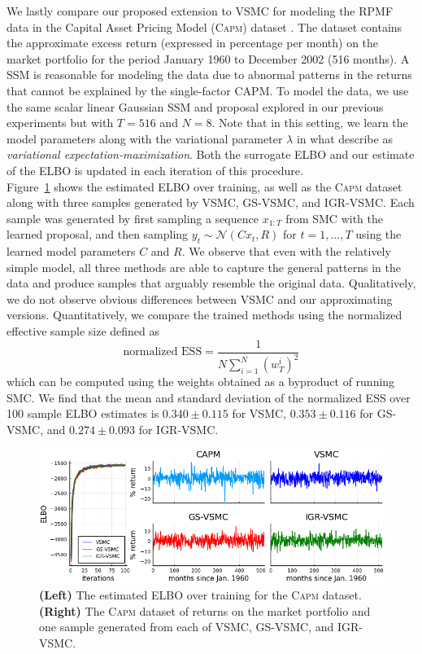 \documentclass[12pt]{article}
\newcommand{\vsmc}{\textsc{VSMC}\xspace}
\newcommand{\gsvsmc}{\textsc{GS-VSMC}\xspace}
\newcommand{\igrvsmc}{\textsc{IGR-VSMC}\xspace}
\newcommand{\smc}{\textsc{SMC}\xspace}
\newcommand{\elbo}{\textsc{ELBO}\xspace}
\newcommand{\ssm}{\textsc{SSM}\xspace}
\newcommand{\capm}{\textsc{Capm}\xspace}
\begin{document}
We lastly compare our proposed extension to \vsmc for modeling the \textsc{RPMF} data in the Capital Asset Pricing Model (\capm) dataset \parencite{Verbeek:2004}. The dataset contains the approximate excess return (expressed in percentage per month) on the market portfolio for the period January 1960 to December 2002 (516 months). A \ssm is reasonable for modeling the data due to abnormal patterns in the returns that cannot be explained by the single-factor CAPM. To model the data, we use the same scalar linear Gaussian \ssm and proposal explored in our previous experiments but with $T=516$ and $N=8$. Note that in this setting, we learn the model parameters along with the variational parameter $\lambda$ in what \textcite{Naesseth:2018} describe as \textit{variational expectation-maximization}. Both the surrogate \elbo and our estimate of the \elbo is updated in each iteration of this procedure.
\\

Figure~\ref{fig:capm_plots} shows the estimated \elbo over training, as well as the \capm dataset along with three samples generated by \vsmc, \gsvsmc, and \igrvsmc. Each sample was generated by first sampling a sequence $x_{1:T}$ from \smc with the learned proposal, and then sampling $y_t\sim \mathcal{N}(Cx_t,R)$ for $t=1,...,T$ using the learned model parameters $C$ and $R$. We observe that even with the relatively simple model, all three methods are able to capture the general patterns in the data and produce samples that arguably resemble the original data. Qualitatively, we do not observe obvious differences between \vsmc and our approximating versions. Quantitatively, we compare the trained methods using the normalized effective sample size defined as
\[
\text{normalized ESS} = \frac{1}{N\sum_{i=1}^N(w_T^i)^2}
\]
which can be computed using the weights obtained as a byproduct of running \smc. We find that the mean and standard deviation of the normalized \textsc{ESS} over 100 sample \elbo estimates is $\mathbf{0.340\pm0.115}$ for \vsmc, $\mathbf{0.353\pm 0.116}$ for \gsvsmc, and $\mathbf{0.274\pm0.093}$ for \igrvsmc.

\begin{figure}[t]
\centering
\includegraphics[width=\textwidth]{figures/capm_plots.png}
\caption{\textbf{(Left)} The estimated \elbo over training for the \capm dataset. \textbf{(Right)} The \capm dataset of returns on the market portfolio and one sample generated from each of \vsmc, \gsvsmc, and \igrvsmc.}
\label{fig:capm_plots}
\end{figure}
\end{document}
